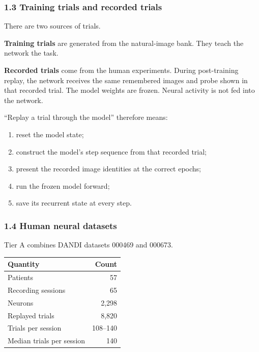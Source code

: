 \documentclass[
  10pt,
]{article}
\providecommand{\tightlist}{%
  \setlength{\itemsep}{0pt}\setlength{\parskip}{0pt}}
\begin{document}
\hypertarget{training-trials-and-recorded-trials}{%
\subsubsection{1.3 Training trials and recorded
trials}\label{training-trials-and-recorded-trials}}

There are two sources of trials.

\textbf{Training trials} are generated from the natural-image bank. They
teach the network the task.

\textbf{Recorded trials} come from the human experiments. During
post-training replay, the network receives the same remembered images
and probe shown in that recorded trial. The model weights are frozen.
Neural activity is not fed into the network.

``Replay a trial through the model'' therefore means:

\begin{enumerate}
\def\labelenumi{\arabic{enumi}.}
\tightlist
\item
  reset the model state;
\item
  construct the model's step sequence from that recorded trial;
\item
  present the recorded image identities at the correct epochs;
\item
  run the frozen model forward;
\item
  save its recurrent state at every step.
\end{enumerate}

\hypertarget{human-neural-datasets}{%
\subsubsection{1.4 Human neural datasets}\label{human-neural-datasets}}

Tier A combines DANDI datasets 000469 and 000673.

\begin{longtable}[]{@{}lr@{}}
\toprule\noalign{}
Quantity & Count \\
\midrule\noalign{}
\endhead
\bottomrule\noalign{}
\endlastfoot
Patients & 57 \\
Recording sessions & 65 \\
Neurons & 2,298 \\
Replayed trials & 8,820 \\
Trials per session & 108--140 \\
Median trials per session & 140 \\
\end{longtable}
\end{document}
